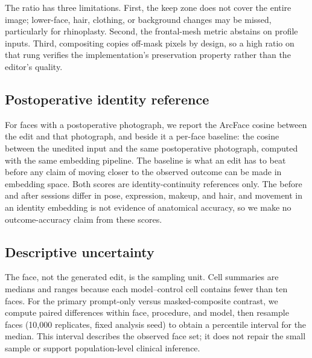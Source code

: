The ratio has three limitations. First, the keep zone does not cover the entire
image; lower-face, hair, clothing, or background changes may be missed,
particularly for rhinoplasty. Second, the frontal-mesh metric abstains on profile
inputs. Third, compositing copies off-mask pixels by design, so a high ratio on
that rung verifies the implementation's preservation property rather than the
editor's quality.

\subsection{Postoperative identity reference}

For faces with a postoperative photograph, we report the ArcFace cosine between
the edit and that photograph, and beside it a per-face baseline: the cosine
between the unedited input and the same postoperative photograph, computed with
the same embedding pipeline. The baseline is what an edit has to beat before any
claim of moving closer to the observed outcome can be made in embedding space.
Both scores are identity-continuity references only. The before and after
sessions differ in pose, expression, makeup, and hair, and movement in an
identity embedding is not evidence of anatomical accuracy, so we make no
outcome-accuracy claim from these scores.

\subsection{Descriptive uncertainty}

The face, not the generated edit, is the sampling unit. Cell summaries are
medians and ranges because each model--control cell contains fewer than ten faces.
For the primary prompt-only versus masked-composite contrast, we compute paired
differences within face, procedure, and model, then resample faces (10{,}000
replicates, fixed analysis seed) to obtain a percentile interval for the median.
This interval describes the observed face set; it does not repair the small sample
or support population-level clinical inference.
